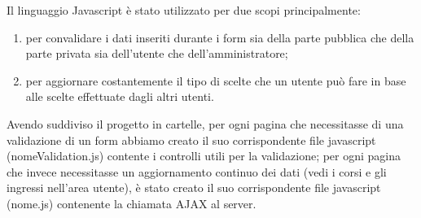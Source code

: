 Il linguaggio Javascript è stato utilizzato per due scopi principalmente:
\begin{enumerate}
    \item per convalidare i dati inseriti durante i form sia della parte pubblica che della parte privata sia dell'utente che dell'amministratore;
    \item per aggiornare costantemente il tipo di scelte che un utente può fare in base alle scelte effettuate dagli altri utenti.
\end{enumerate}
Avendo suddiviso il progetto in cartelle, per ogni pagina che necessitasse di una validazione di un form abbiamo creato il suo corrispondente file
javascript (nomeValidation.js) contente i controlli utili per la validazione; per ogni pagina che invece necessitasse un aggiornamento continuo dei dati (vedi i corsi e gli
ingressi nell'area utente), è stato creato il suo corrispondente file javascript (nome.js) contenente la chiamata AJAX al server.